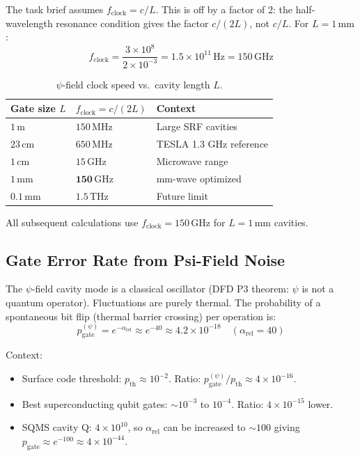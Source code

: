 \documentclass[11pt]{article}
\theoremstyle{definition}
\theoremstyle{remark}
\begin{document}
The task brief assumes $f_{\mathrm{clock}} = c/L$. This is off by a
factor of 2: the half-wavelength resonance condition gives the factor
$c/(2L)$, not $c/L$. For $L = 1\,\mathrm{mm}$:
\begin{equation}
f_{\mathrm{clock}} = \frac{3\times 10^8}{2 \times 10^{-3}} = 1.5\times 10^{11}\,\mathrm{Hz}
= 150\,\mathrm{GHz}
\end{equation}

\begin{table}[h]
\centering
\caption{$\psi$-field clock speed vs.\ cavity length $L$.}
\label{tab:clock}
\begin{tabular}{@{}lll@{}}
\toprule
Gate size $L$ & $f_{\mathrm{clock}} = c/(2L)$ & Context \\
\midrule
$1\,\mathrm{m}$ & $150\,\mathrm{MHz}$ & Large SRF cavities \\
$23\,\mathrm{cm}$ & $650\,\mathrm{MHz}$ & TESLA 1.3 GHz reference \\
$1\,\mathrm{cm}$ & $15\,\mathrm{GHz}$ & Microwave range \\
$1\,\mathrm{mm}$ & $\mathbf{150\,\mathrm{GHz}}$ & mm-wave optimized \\
$0.1\,\mathrm{mm}$ & $1.5\,\mathrm{THz}$ & Future limit \\
\bottomrule
\end{tabular}
\end{table}

All subsequent calculations use $f_{\mathrm{clock}} = 150\,\mathrm{GHz}$
for $L = 1\,\mathrm{mm}$ cavities.

\subsection{Gate Error Rate from Psi-Field Noise}
\label{sec:gate_error}

The $\psi$-field cavity mode is a classical oscillator (DFD P3 theorem:
$\psi$ is not a quantum operator). Fluctuations are purely thermal.
The probability of a spontaneous bit flip (thermal barrier crossing)
per operation is:
\begin{equation}
\boxed{
p_{\mathrm{gate}}^{(\psi)} = e^{-\alpha_{\mathrm{rel}}} \approx e^{-40}
\approx 4.2 \times 10^{-18}
\quad (\alpha_{\mathrm{rel}} = 40)
}
\label{eq:gate_error}
\end{equation}

Context:
\begin{itemize}
\item Surface code threshold: $p_{\mathrm{th}} \approx 10^{-2}$.
  Ratio: $p_{\mathrm{gate}}^{(\psi)} / p_{\mathrm{th}} \approx 4 \times 10^{-16}$.
\item Best superconducting qubit gates: $\sim 10^{-3}$ to $10^{-4}$.
  Ratio: $4 \times 10^{-15}$ lower.
\item SQMS cavity Q: $4 \times 10^{10}$, so $\alpha_{\mathrm{rel}}$ can
  be increased to $\sim 100$ giving $p_{\mathrm{gate}} \approx e^{-100}
  \approx 4 \times 10^{-44}$.
\end{itemize}
\end{document}
